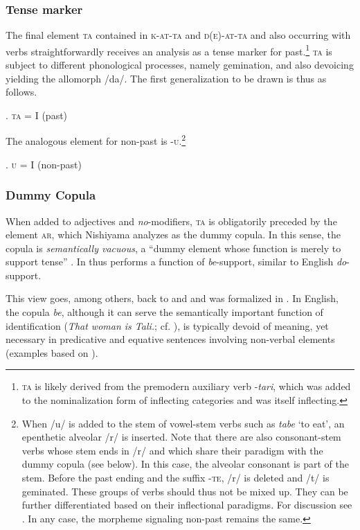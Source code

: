 \documentclass [output=book,colorlinks,citecolor=brown]{langscibook}
\begin{document}
\subsubsection{Tense marker}

The final element \textsc{ta} contained in \textsc{k-at-ta} and \textsc{d(e)-at-ta} and also occurring with verbs straightforwardly receives an analysis as a tense marker for past.\footnote{\textsc{ta} is likely derived from the premodern auxiliary verb -\textit{tari}, which was added to the nominalization form of inflecting categories and was itself inflecting.} \textsc{ta} is subject to different phonological processes, namely gemination, and also devoicing yielding the allomorph /da/. The first generalization to be drawn is thus as follows. %

\ex. \textsc{ta} = \textsc{I} (past)

The analogous element for non-past is -\textsc{u}.\footnote{When /u/ is added to the stem of vowel-stem verbs such as \textit{tabe} `to eat’, an epenthetic alveolar /r/ is inserted. Note that there are also consonant-stem verbs whose stem ends in /r/ and which share their paradigm with the dummy copula (see below). In this case, the alveolar consonant is part of the stem. Before the past ending and the suffix -\textsc{te}, /r/ is deleted and /t/ is geminated. These groups of verbs should thus not be mixed up. They can be further differentiated based on their inflectional paradigms. For discussion see \citet[364–365]{ito:2015:word}. In any case, the morpheme signaling non-past remains the same.}

\ex. \textsc{u} = \textsc{I} (non-past)

\subsubsection{Dummy Copula}

When added to adjectives and \textit{no}-modifiers, \textsc{ta} is obligatorily preceded by the element \textsc{ar}, which Nishiyama analyzes as the dummy copula. In this sense, the copula is \textit{semantically vacuous}, a ``dummy element whose function is merely to support tense'' \citep[187]{nishiyama:1999:adj}. In thus performs a function of \textit{be}-support, similar to English \textit{do}-support.

This view goes, among others, back to \citet{bach:1967:have} and \citet{doron:1983:verbless} and was formalized in \citet{rapoport:1987:copular}. In English, the copula \textit{be}, although it can serve the semantically important function of identification (\textit{That woman is Tali.}; cf. \citealt[150]{rapoport:1987:copular}), is typically devoid of meaning, yet necessary in predicative and equative sentences involving non-verbal elements (examples based on \citealt[156]{rapoport:1987:copular}).
\end{document}
